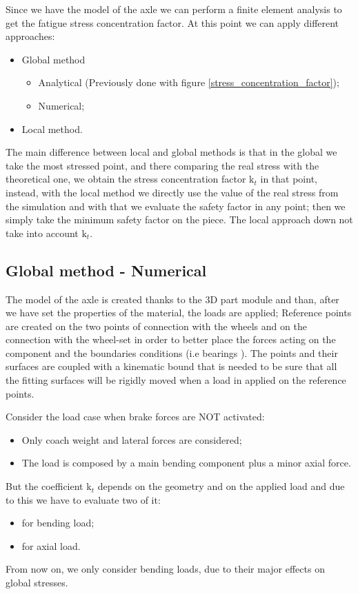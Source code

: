 \documentclass[a4paper,12pt]{article}
\begin{document}
Since we have the model of the axle we can perform a finite element analysis to get the fatigue stress concentration factor.
At this point we can apply different approaches:
\begin{itemize}
\item Global method
\begin{itemize}
\item Analytical (Previously done with figure \ref{stress_concentration_factor});
\item Numerical;
\end{itemize}
\item Local method.
\end{itemize}

The main difference between local and global methods is that in the global we take the most stressed point, and there comparing the real stress with the theoretical one, we obtain the stress concentration factor $\text{k}_t$ in that point, instead, with the local method we directly use the value of the real stress from the simulation and with that we evaluate the safety factor in any point; then we simply take the minimum safety factor on the piece. The local approach down not take into account $\text{k}_t$.

\subsection{Global method - Numerical}

The model of the axle is created thanks to the 3D part module and than, after we have set the properties of the material, the loads are applied;
Reference points are created on the two points of connection with the wheels and on the connection with the wheel-set in order to better place the forces acting on the component and the boundaries conditions (i.e bearings ). The points and their surfaces are coupled with a kinematic bound that is needed to be sure that all the fitting surfaces will be rigidly moved when a load in applied on the reference points.

Consider the load case when brake forces are NOT activated:
\begin{itemize}
\item Only coach weight and lateral forces are considered;
\item The load is composed by a main bending component plus a minor axial force.
\end{itemize}

But the coefficient $\text{k}_t$ depends on the geometry and on the applied load and due to this we have to evaluate two of it:
\begin{itemize}
\item for bending load;
\item for axial load.
\end{itemize}
From now on, we only consider bending loads, due to their major effects on global stresses.
\end{document}
